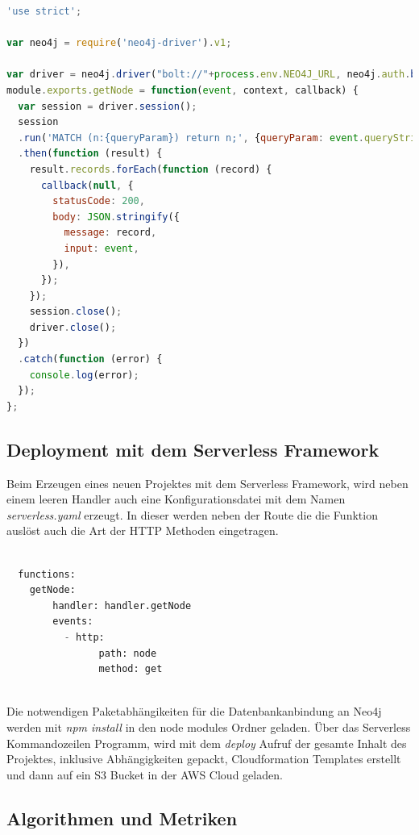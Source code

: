 \begin{lstlisting}[language=JavaScript, frame=htrbl, caption={Lambda Handler Funktion}, label={lst:lambda_handler}]
	'use strict';

var neo4j = require('neo4j-driver').v1;

var driver = neo4j.driver("bolt://"+process.env.NEO4J_URL, neo4j.auth.basic("user" ,"password"));
module.exports.getNode = function(event, context, callback) {
  var session = driver.session();
  session
  .run('MATCH (n:{queryParam}) return n;', {queryParam: event.queryStringParameters.label})
  .then(function (result) {
    result.records.forEach(function (record) {
      callback(null, {
        statusCode: 200,
        body: JSON.stringify({
          message: record,
          input: event,
        }),
      });
    });
    session.close();
    driver.close();
  })
  .catch(function (error) {
    console.log(error);
  });
};


\end{lstlisting}


\subsection{Deployment mit dem Serverless Framework}

Beim Erzeugen eines neuen Projektes mit dem Serverless Framework, wird neben einem leeren Handler auch eine Konfigurationsdatei mit dem Namen \textit{serverless.yaml} erzeugt. In dieser werden neben der Route die die Funktion auslöst auch die Art der HTTP Methoden eingetragen.\newline

\begin{lstlisting}[language=Python, frame=htrbl, caption={Serverless Konfiguration}, label={lst:serverless_yaml}]

  functions:
  	getNode:
    	handler: handler.getNode
    	events: 
          - http: 
            	path: node 
         		method: get 
         		
\end{lstlisting}

Die notwendigen Paketabhängikeiten für die Datenbankanbindung an Neo4j werden mit \textit{npm install} in den node modules Ordner geladen. Über das Serverless Kommandozeilen Programm, wird mit dem \textit{deploy} Aufruf der gesamte Inhalt des Projektes, inklusive Abhängigkeiten gepackt, Cloudformation Templates erstellt und dann auf ein S3 Bucket in der AWS Cloud geladen. 

\subsection{Algorithmen und Metriken}


